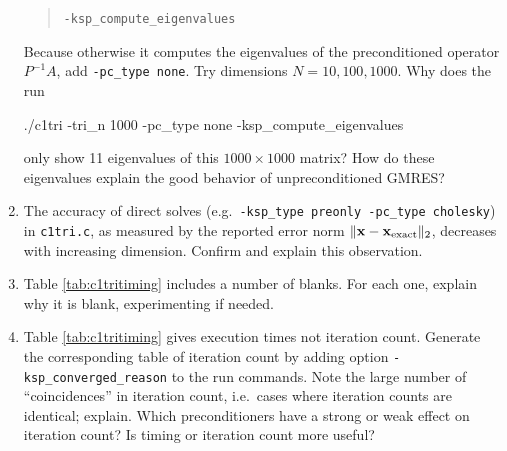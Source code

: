 \begin{enumerate}
\begin{quote}
\texttt{-ksp\_compute\_eigenvalues}
\end{quote}
Because otherwise it computes the eigenvalues of the preconditioned operator $P^{-1}A$, add \texttt{-pc\_type none}.  Try dimensions $N=10,100,1000$.  Why does the  run
\begin{cline}
./c1tri -tri_n 1000 -pc_type none -ksp_compute_eigenvalues
\end{cline}
only show 11 eigenvalues of this $1000\times 1000$ matrix?  How do these eigenvalues explain the good behavior of unpreconditioned GMRES?
\item The accuracy of direct solves (e.g.~\texttt{-ksp\_type preonly -pc\_type cholesky}) in \texttt{c1tri.c}, as measured by the reported error norm $\|\mathbf{x} - \mathbf{x}_{\text{exact}}\|_2$, decreases with increasing dimension.  Confirm and explain this observation.
\item Table \ref{tab:c1tritiming} includes a number of blanks.  For each one, explain why it is blank, experimenting if needed.
\item Table \ref{tab:c1tritiming} gives execution times not iteration count.  Generate the corresponding table of \pKSP iteration count by adding option \verb|-ksp_converged_reason| to the run commands.  Note the large number of ``coincidences'' in iteration count, i.e.~cases where iteration counts are identical; explain.  Which preconditioners have a strong or weak effect on iteration count?  Is timing or iteration count more useful?
\end{enumerate}